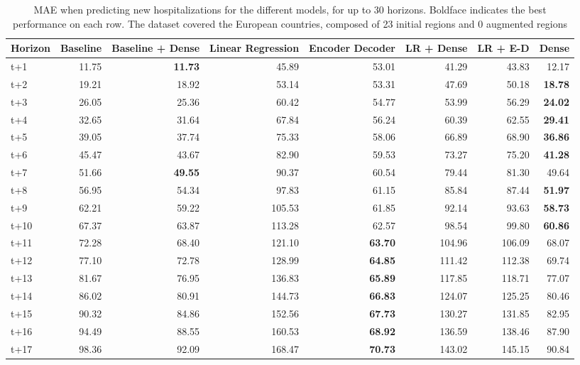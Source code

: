 \begin{table}[H]
\centering
\caption{MAE when predicting new hospitalizations for the different models, for up to 30 horizons. Boldface indicates the best performance on each row. The dataset covered the European countries, composed of 23 initial regions and 0 augmented regions }
\label{tab:MAE_comparison}
\begin{tabular}{lrrrrrrr}
\toprule
Horizon &  Baseline &  Baseline + Dense &  Linear Regression &  Encoder Decoder &  LR + Dense &  LR + E-D &  Dense \\
\midrule
t+1  & 11.75  & \textbf{11.73}  & 45.89  & 53.01  & 41.29  & 43.83  & 12.17  \\
t+2  & 19.21  & 18.92  & 53.14  & 53.31  & 47.69  & 50.18  & \textbf{18.78}  \\
t+3  & 26.05  & 25.36  & 60.42  & 54.77  & 53.99  & 56.29  & \textbf{24.02}  \\
t+4  & 32.65  & 31.64  & 67.84  & 56.24  & 60.39  & 62.55  & \textbf{29.41}  \\
t+5  & 39.05  & 37.74  & 75.33  & 58.06  & 66.89  & 68.90  & \textbf{36.86}  \\
t+6  & 45.47  & 43.67  & 82.90  & 59.53  & 73.27  & 75.20  & \textbf{41.28}  \\
t+7  & 51.66  & \textbf{49.55}  & 90.37  & 60.54  & 79.44  & 81.30  & 49.64  \\
t+8  & 56.95  & 54.34  & 97.83  & 61.15  & 85.84  & 87.44  & \textbf{51.97}  \\
t+9  & 62.21  & 59.22  & 105.53  & 61.85  & 92.14  & 93.63  & \textbf{58.73}  \\
t+10  & 67.37  & 63.87  & 113.28  & 62.57  & 98.54  & 99.80  & \textbf{60.86}  \\
t+11  & 72.28  & 68.40  & 121.10  & \textbf{63.70}  & 104.96  & 106.09  & 68.07  \\
t+12  & 77.10  & 72.78  & 128.99  & \textbf{64.85}  & 111.42  & 112.38  & 69.74  \\
t+13  & 81.67  & 76.95  & 136.83  & \textbf{65.89}  & 117.85  & 118.71  & 77.07  \\
t+14  & 86.02  & 80.91  & 144.73  & \textbf{66.83}  & 124.07  & 125.25  & 80.46  \\
t+15  & 90.32  & 84.86  & 152.56  & \textbf{67.73}  & 130.27  & 131.85  & 82.95  \\
t+16  & 94.49  & 88.55  & 160.53  & \textbf{68.92}  & 136.59  & 138.46  & 87.90  \\
t+17  & 98.36  & 92.09  & 168.47  & \textbf{70.73}  & 143.02  & 145.15  & 90.84  \\

\end{tabular}
\end{table}
